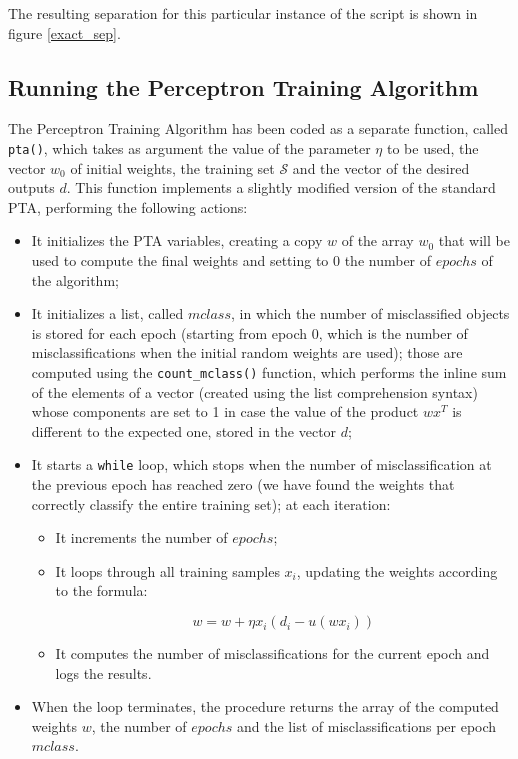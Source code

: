 \documentclass[letterpaper,headings=standardclasses]{scrartcl}
\begin{document}
The resulting separation for this particular instance of the script is shown in figure \ref{exact_sep}.

\subsection{Running the Perceptron Training Algorithm}

The Perceptron Training Algorithm has been coded as a separate function, called \texttt{pta()}, which takes as argument the value of the parameter $\eta$ to be used, the vector $w_0$ of initial weights, the training set $\mathcal{S}$ and the vector of the desired outputs $d$. This function implements a slightly modified version of the standard PTA, performing the following actions:

\begin{itemize}

\item It initializes the PTA variables, creating a copy $w$ of the array $w_0$ that will be used to compute the final weights and setting to 0 the number of $epochs$ of the algorithm;

\item It initializes a list, called $mclass$, in which the number of misclassified objects is stored for each epoch (starting from epoch 0, which is the number of misclassifications when the initial random weights are used); those are computed using the \texttt{count\_mclass()} function, which performs the inline sum of the elements of a vector (created using the list comprehension syntax) whose components are set to 1 in case the value of the product $wx^T$ is different to the expected one, stored in the vector $d$;

\item It starts a \texttt{while} loop, which stops when the number of misclassification at the previous epoch has reached zero (we have found the weights that correctly classify the entire training set); at each iteration:

\begin{itemize}

\item It increments the number of $epochs$;

\item It loops through all training samples $x_i$, updating the weights according to the formula:

$$ w = w + \eta x_i (d_i - u(w x_i)) $$

\item It computes the number of misclassifications for the current epoch and logs the results.

\end{itemize}

\item When the loop terminates, the procedure returns the array of the computed weights $w$, the number of $epochs$ and the list of misclassifications per epoch $mclass$.

\end{itemize}
\end{document}
